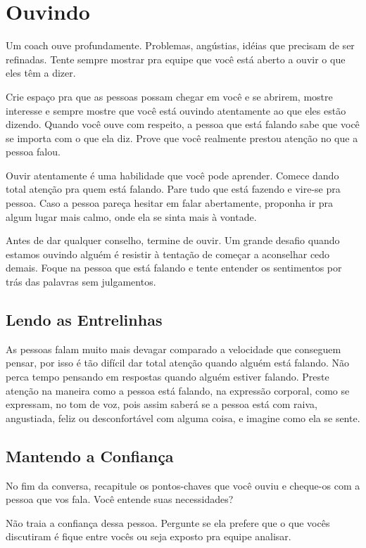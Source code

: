 \documentclass[a4paper, 10pt, font=plain]{abnt}
\begin{document}
\section{Ouvindo}
Um coach ouve profundamente. Problemas, angústias, idéias que precisam de ser refinadas. Tente sempre mostrar pra equipe que você está aberto a ouvir o que eles têm a dizer.

Crie espaço pra que as pessoas possam chegar em você e se abrirem, mostre interesse e sempre mostre que você está ouvindo atentamente ao que eles estão dizendo. Quando você ouve com respeito, a pessoa que está falando sabe que você se importa com o que ela diz. Prove que você realmente prestou atenção no que a pessoa falou.

Ouvir atentamente é uma habilidade que você pode aprender. Comece dando total atenção pra quem está falando. Pare tudo que está fazendo e vire-se pra pessoa. Caso a pessoa pareça hesitar em falar abertamente, proponha ir pra algum lugar mais calmo, onde ela se sinta mais à vontade.

Antes de dar qualquer conselho, termine de ouvir. Um grande desafio quando estamos ouvindo alguém é resistir à tentação de começar a aconselhar cedo demais. Foque na pessoa que está falando e tente entender os sentimentos por trás das palavras sem julgamentos.

\subsection{Lendo as Entrelinhas}
As pessoas falam muito mais devagar comparado a velocidade que conseguem pensar, por isso é tão difícil dar total atenção quando alguém está falando. Não perca tempo pensando em respostas quando alguém estiver falando. Preste atenção na maneira como a pessoa está falando, na expressão corporal, como se expressam, no tom de voz, pois assim saberá se a pessoa está com raiva, angustiada, feliz ou desconfortável com alguma coisa, e imagine como ela se sente.

\subsection{Mantendo a Confiança}
No fim da conversa, recapitule os pontos-chaves que você ouviu e cheque-os com a pessoa que vos fala. Você entende suas necessidades?

Não traia a confiança dessa pessoa. Pergunte se ela prefere que o que vocês discutiram é fique entre vocês ou seja exposto pra equipe analisar.
\end{document}
